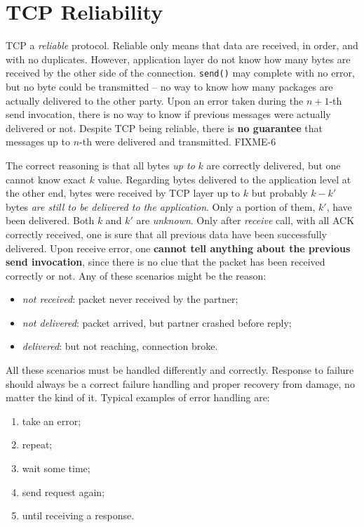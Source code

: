 \documentclass[a4paper, 11pt]{report}
\begin{document}
\chapter{TCP Reliability}

TCP a \emph{reliable} protocol. Reliable only means that data are received, in
order, and with no duplicates. However, application layer do not know how many
bytes are received by the other side of the connection. \texttt{send()} may
complete with no error, but no byte could be transmitted \--- no way to know
how many packages are actually delivered to the other party. Upon an error
taken during the $n+1$-th send invocation, there is no way to know if previous
messages were actually delivered or not. Despite TCP being reliable, there is
\textbf{no guarantee} that messages up to $n$-th were delivered and
transmitted. FIXME-6

The correct reasoning is that all bytes \emph{up to} $k$ are correctly
delivered, but one cannot know exact $k$ value. Regarding bytes delivered to
the application level at the other end, bytes were received by TCP layer up to
$k$ but probably $k - k'$ bytes \emph{are still to be delivered to the
application}. Only a portion of them, $k'$, have been delivered. Both $k$ and
$k'$ are \emph{unknown}. Only after \emph{receive} call, with all ACK correctly
received, one is sure that all previous data have been successfully delivered.
Upon receive error, one \textbf{cannot tell anything about the previous send
invocation}, since there is no clue that the packet has been received correctly
or not. Any of these scenarios might be the reason:
\begin{itemize}
    \item \emph{not received}: packet never received by the partner;
    \item \emph{not delivered}: packet arrived, but partner crashed before
        reply;
    \item \emph{delivered}: but not reaching, connection broke.
\end{itemize}

All these scenarios must be handled differently and correctly. Response to
failure should always be a correct failure handling and proper recovery from
damage, no matter the kind of it. Typical examples of error handling are:
\begin{enumerate}
	\item take an error;
    \item repeat;
    \item wait some time;
    \item send request again;
    \item until receiving a response.
\end{enumerate}
\end{document}
